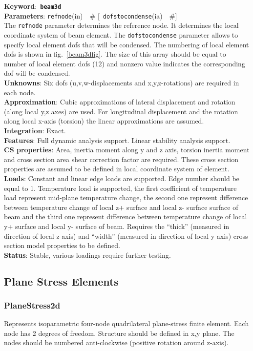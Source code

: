 \documentclass[a4paper]{article}
\newcommand{\descitem}[1]{{\noindent \bf #1}:}
\newcommand{\elemkeyword}[1]{\descitem{Keyword}~{\bf \texttt{#1}}}
\newcommand{\elemparam}[2]{{{\texttt{#1}\tiny (#2)}~~\#}}
\newcommand{\optelemparam}[2]{{[~\elemparam{#1}{#2}]}}
\newcommand{\param}[1]{{\texttt{#1}}}
\begin{document}
\elemkeyword{beam3d}\\
\descitem{Parameters} \elemparam{refnode}{in}
\optelemparam{dofstocondense}{ia}\\
The \param{refnode} parameter
determines the reference node. It determines the local coordinate
system of beam element. The \param{dofstocondense} parameter allows to
specify local element dofs that will be condensed. The numbering of
local element dofs is shown in fig.~\ref{beam3dfig}. The size of this
array should be equal to number of local element dofs (12) and nonzero
value indicates the corresponding dof will be condensed.\\
\descitem{Unknowns}
Six dofs (u,v,w-displacements and x,y,z-rotations) are required in each node.\\
\descitem{Approximation} Cubic  approximations of lateral displacement and
rotation (along local y,z axes) are used. For longitudinal displacement
and the rotation along local x-axis (torsion) the linear
approximations are assumed.\\
\descitem{Integration} Exact.\\
\descitem{Features} Full dynamic analysis support. Linear stability
analysis support.\\
\descitem{CS properties} Area, inertia moment along y and z axis, torsion inertia moment and 
cross section area shear correction factor are required. These
cross section properties are assumed to be defined in local coordinate
system of element.\\
\descitem{Loads}  Constant and linear edge loads are supported.
Edge number should be equal to 1. Temperature load is
supported, the first coefficient of temperature load represent
mid-plane temperature change, the second one represent difference
between temperature change of local z+ surface and local
z- surface surface of beam and the third one represent difference
between temperature change of local y+ surface and  local
y- surface of beam. Requires the ``thick'' (measured in direction of
local z axis) and ``width'' (measured in direction of local y axis) cross section
model properties to be defined.\\
\descitem{Status} Stable, various loadings require further testing.

\subsection{Plane Stress Elements}
\subsubsection{PlaneStress2d}
Represents isoparametric four-node quadrilateral plane-stress
finite element. Each node has 2 degrees of freedom.
Structure should be defined in x,y plane. 
The nodes should be numbered anti-clockwise (positive rotation around
z-axis). 
\end{document}
